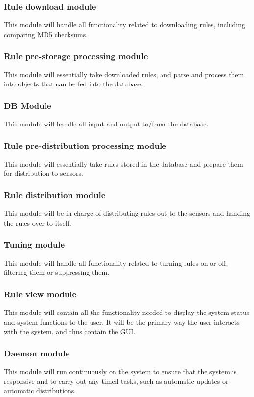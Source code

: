 \subsubsection{Rule download module}
This module will handle all functionality related to downloading rules,
including comparing MD5 checksums.
\subsubsection{Rule pre-storage processing module}
This module will essentially take downloaded rules, and parse and process them
into objects that can be fed into the database.
\subsubsection{DB Module}
This module will handle all input and output to/from the database.
\subsubsection{Rule pre-distribution processing module}
This module will essentially take rules stored in the database and prepare them for
distribution to sensors.
\subsubsection{Rule distribution module}
This module will be in charge of distributing rules out to the \snort{} sensors
and handing the rules over to \snort{} itself.
\subsubsection{Tuning module}
This module will handle all functionality related to turning rules on or off,
filtering them or suppressing them.
\subsubsection{Rule view module}
This module will contain all the functionality needed to display the system
status and system functions to the user. It will be the primary way the user
interacts with the system, and thus contain the GUI.
\subsubsection{Daemon module}
This module will run continuously on the system to ensure that the system is
responsive and to carry out any timed tasks, such as automatic updates or
automatic distributions.
